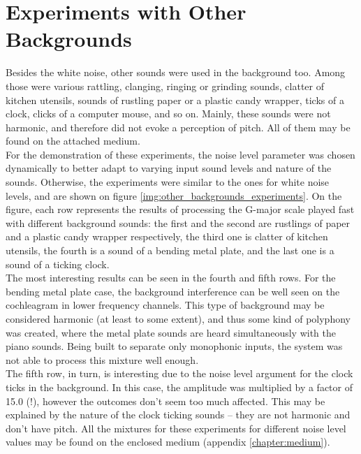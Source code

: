 \section{Experiments with Other Backgrounds}

Besides the white noise, other sounds were used in the background too. Among those were various rattling, clanging, ringing or grinding sounds, clatter of kitchen utensils, sounds of rustling paper or a plastic candy wrapper, ticks of a clock, clicks of a computer mouse, and so on. Mainly, these sounds were not harmonic, and therefore did not evoke a perception of pitch. All of them may be found on the attached medium.\\

For the demonstration of these experiments, the noise level parameter was chosen dynami\-cally to better adapt to varying input sound levels and nature of the sounds. Otherwise, the experiments were similar to the ones for white noise levels, and are shown on figure \ref{img:other_backgrounds_experiments}. On the figure, each row represents the results of processing the G-major scale played fast with different background sounds: the first and the second are rustlings of paper and a plastic candy wrapper respectively, the third one is clatter of kitchen utensils, the fourth is a sound of a bending metal plate, and the last one is a sound of a ticking clock.\\

The most interesting results can be seen in the fourth and fifth rows. For the bending metal plate case, the background interference can be well seen on the cochleagram in lower frequency channels. This type of background may be considered harmonic (at least to some extent), and thus some kind of polyphony was created, where the metal plate sounds are heard simultaneously with the piano sounds. Being built to separate only monophonic inputs, the system was not able to process this mixture well enough.\\

The fifth row, in turn, is interesting due to the noise level argument for the clock ticks in the background. In this case, the amplitude was multiplied by a factor of 15.0 (!), however the outcomes don't seem too much affected. This may be explained by the nature of the clock ticking sounds -- they are not harmonic and don't have pitch. All the mixtures for these experiments for different noise level values may be found on the enclosed medium (appendix \ref{chapter:medium}).

